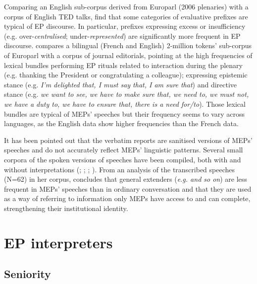 \documentclass[output=paper]{langscibook}
\begin{document}
Comparing an English sub-corpus derived from Europarl (2006 plenaries) with a corpus of English TED talks, \citet{LeferGrabar2015} find that some categories of evaluative prefixes are typical of EP discourse. In particular, prefixes expressing excess or insufficiency (e.g. over-\textit{centralised}; under-\textit{represented}) are significantly more frequent in EP discourse. \citet{granger_lexical_2014} compares a bilingual (French and English) 2-million tokens’ sub-corpus of Europarl with a corpus of journal editorials, pointing at the high frequencies of lexical bundles performing EP rituals related to interaction during the plenary (e.g. thanking the President or congratulating a colleague); expressing epistemic stance (e.g. \textit{I’m delighted that, I must say that, I am sure that}) and directive stance (e.g. \textit{we want to see, we have to make sure that, we need to, we must not, we have a duty to, we have to ensure that, there is a need for/to}). Those lexical bundles are typical of MEPs’ speeches but their frequency seems to vary across languages, as the English data show higher frequencies than the French data. 

It has been pointed out that the verbatim reports are sanitised versions of MEPs’ speeches \citep{Cucchi2009} and do not accurately reflect MEPs’ linguistic patterns. Several small corpora of the spoken versions of speeches have been compiled, both with and without interpretations (\citealt{BernardiniEtAl2018}; \citealt{Cucchi2007}; \citealt{KajzerWietrzny2012}; \citealt{RussoEtAl2006}). From an analysis of the transcribed speeches (N=62) in her corpus, \citet{Cucchi2009} concludes that general extenders (\textit{e.g. and so on}) are less frequent in MEPs’ speeches than in ordinary conversation and that they are used as a way of referring to information only MEPs have access to and can complete, strengthening their institutional identity.

\section{EP interpreters}\label{sec:defrancq:4}

\subsection{Seniority}\label{sec:defrancq:4.1}
\end{document}

